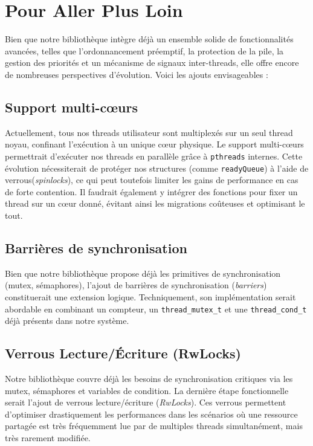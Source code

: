 \section{Pour Aller Plus Loin}
Bien que notre bibliothèque intègre déjà un ensemble solide de fonctionnalités avancées, 
telles que l'ordonnancement préemptif, la protection de la pile, 
la gestion des priorités et un mécanisme de signaux inter-threads, 
elle offre encore de nombreuses perspectives d'évolution.
Voici les ajouts envisageables :

\subsection{Support multi-cœurs }

Actuellement, tous nos threads utilisateur sont multiplexés sur un seul thread noyau, 
confinant l'exécution à un unique cœur physique. 
Le support multi-cœurs permettrait d'exécuter nos threads en parallèle grâce à \texttt{pthreads} internes. 
Cette évolution nécessiterait de protéger nos structures (comme \texttt{readyQueue}) 
à l'aide de verrous(\textit{spinlocks}), ce qui peut toutefois limiter les gains de performance 
en cas de forte contention. Il faudrait également y intégrer des fonctions pour 
fixer un thread sur un cœur donné, évitant ainsi les migrations coûteuses et optimisant le tout.


\subsection{Barrières de synchronisation}

Bien que notre bibliothèque propose déjà les primitives de synchronisation (mutex, sémaphores), l'ajout de barrières de synchronisation (\textit{barriers}) constituerait une extension logique. Techniquement, son implémentation serait abordable en combinant un compteur, un \texttt{thread\_mutex\_t} et une \texttt{thread\_cond\_t}  déjà présents dans notre système.

\subsection{Verrous Lecture/Écriture (RwLocks)}

Notre bibliothèque couvre déjà les besoins de synchronisation critiques via les mutex, sémaphores et variables de condition. La dernière étape fonctionnelle serait l'ajout de verrous lecture/écriture (\textit{RwLocks}). Ces verrous permettent d'optimiser drastiquement les performances dans les scénarios où une ressource partagée est très fréquemment lue par de multiples threads simultanément, mais très rarement modifiée.

